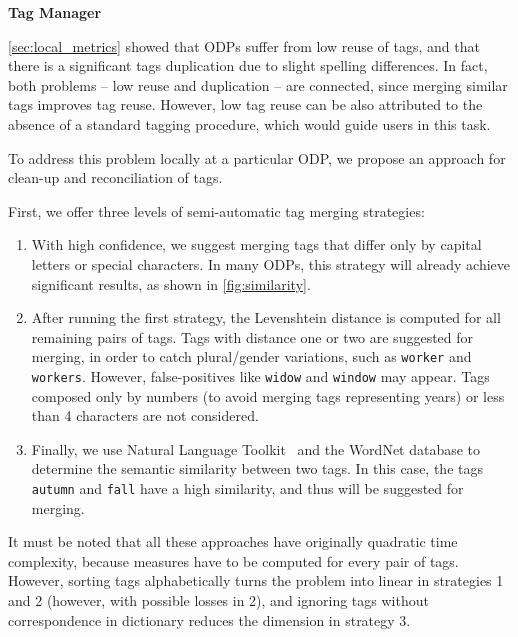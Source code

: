 \noindent\textbf{Tag Manager}

\autoref{sec:local_metrics} showed that ODPs suffer from low reuse of tags, and that there is a significant tags duplication due to slight spelling differences. 
In fact, both problems -- low reuse and duplication -- are connected, since merging similar tags improves tag reuse.
However, low tag reuse can be also attributed to the absence of a standard tagging procedure, which would guide users in this task.

To address this problem locally at a particular ODP, we propose an approach for clean-up and reconciliation of tags. %

First, we offer three levels of semi-automatic tag merging strategies:


\begin{enumerate}
	\item With high confidence, we suggest merging tags that differ only by capital letters or special characters. 
In many ODPs, this strategy will already achieve significant results, as shown in \autoref{fig:similarity}.
	\item After running the first strategy, the Levenshtein distance is computed for all remaining pairs of tags.
Tags with distance one or two are suggested for merging, in order to catch plural/gender variations, such as \texttt{worker} and \texttt{workers}. 
However, false-positives like \texttt{widow} and \texttt{window} may appear.
Tags composed only by numbers (to avoid merging tags representing years) or less than 4 characters are not considered.
	\item Finally, we use Natural Language Toolkit~\cite{Bird2009} and the WordNet database to determine the semantic similarity between two tags.
In this case, the tags \texttt{autumn} and \texttt{fall} have a high similarity, and thus will be suggested for merging.
\end{enumerate}

It must be noted that all these approaches have originally quadratic time complexity, because measures have to be computed for every pair of tags. However, sorting tags alphabetically turns the problem into linear in strategies 1 and 2 (however, with possible losses in 2), and ignoring tags without correspondence in dictionary reduces the dimension in strategy 3.

